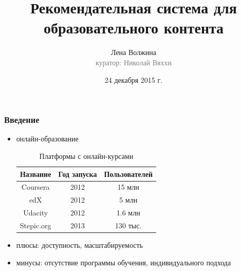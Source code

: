 \documentclass{beamer}
\begin{document}
    \title{Рекомендательная система для образовательного контента}
    \author{Лена Волжина\\{\footnotesize\textcolor{gray}{куратор: Николай Вяххи}}}
    \date{24 декабря 2015 г.}     %
\frame{\titlepage}

\begin{frame}\frametitle{Введение} 
    \begin{itemize}
        \item онлайн-образование
        
        \begin{table}[H]
            \caption{Платформы с онлайн-курсами}
            \label{tabular:statistic}
            \begin{center}
            \begin{tabular}{c|c|c}
            \hline
            Название & Год запуска & Пользователей \\
            \hline
            Coursera & 2012 & 15 млн \\
            edX & 2012 & 5 млн \\
            Udacity & 2012 & 1.6 млн \\
            Stepic.org & 2013 & 130 тыс. \\
            
            \end{tabular}
            \end{center}
        \end{table}
    
        \item плюсы: доступность, масштабируемость %
        \item минусы: отсутствие программы обучения, индивидуального подхода
    \end{itemize}
\end{frame}
\end{document}
